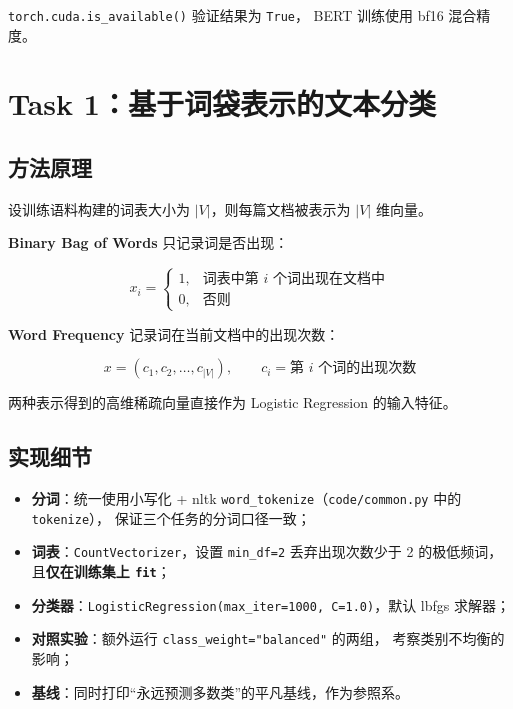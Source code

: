 \documentclass[12pt,a4paper]{ctexart}
\newcommand{\fpath}[1]{\texttt{#1}}
\begin{document}
\fpath{torch.cuda.is\_available()} 验证结果为 \fpath{True}，
BERT 训练使用 bf16 混合精度。

\section{Task 1：基于词袋表示的文本分类}

\subsection{方法原理}

设训练语料构建的词表大小为 $|V|$，则每篇文档被表示为 $|V|$ 维向量。

\textbf{Binary Bag of Words} 只记录词是否出现：

\begin{equation}
x_i =
\begin{cases}
1, & \text{词表中第 } i \text{ 个词出现在文档中}\\
0, & \text{否则}
\end{cases}
\end{equation}

\textbf{Word Frequency} 记录词在当前文档中的出现次数：

\begin{equation}
x = (c_1, c_2, \ldots, c_{|V|}), \qquad c_i = \text{第 } i \text{ 个词的出现次数}
\end{equation}

两种表示得到的高维稀疏向量直接作为 Logistic Regression 的输入特征。

\subsection{实现细节}

\begin{itemize}
  \item \textbf{分词}：统一使用小写化 + nltk \fpath{word\_tokenize}（\fpath{code/common.py} 中的 \fpath{tokenize}），
        保证三个任务的分词口径一致；
  \item \textbf{词表}：\fpath{CountVectorizer}，设置 \fpath{min\_df=2} 丢弃出现次数少于 2 的极低频词，
        且\textbf{仅在训练集上 \fpath{fit}}；
  \item \textbf{分类器}：\fpath{LogisticRegression(max\_iter=1000, C=1.0)}，默认 lbfgs 求解器；
  \item \textbf{对照实验}：额外运行 \fpath{class\_weight="balanced"} 的两组，
        考察类别不均衡的影响；
  \item \textbf{基线}：同时打印``永远预测多数类''的平凡基线，作为参照系。
\end{itemize}
\end{document}
